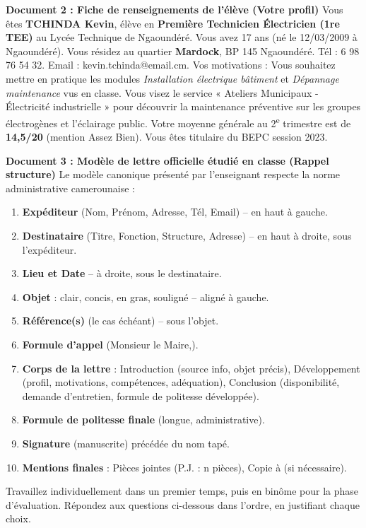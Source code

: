 \documentclass[11pt]{article}
\newcounter{popsec}
\newcounter{popsub}
\newcommand{\courssub}[1]{%
  \stepcounter{popsub}%
  \par\vspace{9pt}\noindent{\popxbold\fontsize{11.5}{13}\selectfont\color{popink}{\color{poporange}\thepopsec.\thepopsub}\hspace{6pt}#1}\par\nopagebreak\vspace{4pt}
}
\begin{document}
\medskip
\noindent \textbf{Document 2 : Fiche de renseignements de l'élève (Votre profil)}
\noindent Vous êtes \textbf{TCHINDA Kevin}, élève en \textbf{Première Technicien Électricien (1re TEE)} au Lycée Technique de Ngaoundéré. Vous avez 17 ans (né le 12/03/2009 à Ngaoundéré). Vous résidez au quartier \textbf{Mardock}, BP 145 Ngaoundéré. Tél : 6 98 76 54 32. Email : kevin.tchinda@email.cm.
\noindent Vos motivations : Vous souhaitez mettre en pratique les modules \emph{Installation électrique bâtiment} et \emph{Dépannage maintenance} vus en classe. Vous visez le service « Ateliers Municipaux - Électricité industrielle » pour découvrir la maintenance préventive sur les groupes électrogènes et l'éclairage public. Votre moyenne générale au 2\textsuperscript{e} trimestre est de \textbf{14,5/20} (mention Assez Bien). Vous êtes titulaire du BEPC session 2023.

\medskip
\noindent \textbf{Document 3 : Modèle de lettre officielle étudié en classe (Rappel structure)}
\noindent Le modèle canonique présenté par l'enseignant respecte la norme administrative camerounaise :
\begin{enumerate}
    \item \textbf{Expéditeur} (Nom, Prénom, Adresse, Tél, Email) -- en haut à gauche.
    \item \textbf{Destinataire} (Titre, Fonction, Structure, Adresse) -- en haut à droite, sous l'expéditeur.
    \item \textbf{Lieu et Date} -- à droite, sous le destinataire.
    \item \textbf{Objet} : clair, concis, en gras, souligné -- aligné à gauche.
    \item \textbf{Référence(s)} (le cas échéant) -- sous l'objet.
    \item \textbf{Formule d'appel} (Monsieur le Maire,).
    \item \textbf{Corps de la lettre} : Introduction (source info, objet précis), Développement (profil, motivations, compétences, adéquation), Conclusion (disponibilité, demande d'entretien, formule de politesse développée).
    \item \textbf{Formule de politesse finale} (longue, administrative).
    \item \textbf{Signature} (manuscrite) précédée du nom tapé.
    \item \textbf{Mentions finales} : Pièces jointes (P.J. : n pièces), Copie à (si nécessaire).
\end{enumerate}

\courssub{Consignes}
\noindent Travaillez individuellement dans un premier temps, puis en binôme pour la phase d'évaluation. Répondez aux questions ci-dessous dans l'ordre, en justifiant chaque choix.
\end{document}
